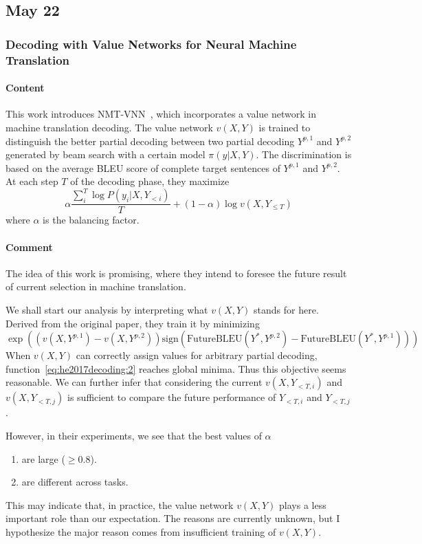 \subsection*{May 22}
\subsubsection*{Decoding with Value Networks for Neural Machine Translation}\label{paper:he2017decoding}

\paragraph{Content}
This work introduces \textsc{NMT-VNN}~\cite{he2017decoding}, which incorporates a value network in machine translation decoding. The value network $v(X, Y)$ is trained to distinguish the better partial decoding  between two partial decoding $Y^{p,1}$ and $Y^{p,2}$ generated by beam search with a certain model $\pi(y|X, Y)$. The discrimination is based on the average BLEU score of complete target sentences of $Y^{p,1}$ and $Y^{p,2}$. At each step $T$ of the decoding phase, they maximize
\begin{equation}\label{eq:he2017decoding:1}
    \alpha\frac{\sum_i^T \log P(y_i|X, Y_{< i})}{T} + (1-\alpha) \log v(X, Y_{\le T})
\end{equation}
where $\alpha$ is the balancing factor.


\paragraph{Comment}
The idea of this work is promising, where they intend to foresee the future result of current selection in machine translation.

We shall start our analysis by interpreting what $v(X,Y)$ stands for here. Derived from the original paper, they train it by minimizing
\begin{equation}\label{eq:he2017decoding:2}
    \exp \left( \left(v(X, Y^{p,1}) - v(X, Y^{p,2})\right) \mathrm{sign}\left(\mathrm{FutureBLEU}(Y^*, Y^{p,2}) - \mathrm{FutureBLEU}(Y^*, Y^{p,1})\right) \right)
\end{equation}
When $v(X, Y)$ can correctly assign values for arbitrary partial decoding, function~\ref{eq:he2017decoding:2} reaches global minima. Thus this objective seems reasonable. We can further infer that considering the current $v(X, Y_{< T, i})$ and $v(X, Y_{< T, j})$ is sufficient to compare the future performance of $Y_{< T, i}$ and $Y_{< T, j}$.

However, in their experiments, we see that the best values of $\alpha$ \begin{enumerate}
    \item are large ($\ge 0.8$).
    \item are different across tasks.
\end{enumerate}
This may indicate that, in practice, the value network $v(X, Y)$ plays a less important role than our expectation. The reasons are currently unknown, but I hypothesize the major reason comes from insufficient training of $v(X,Y)$.
